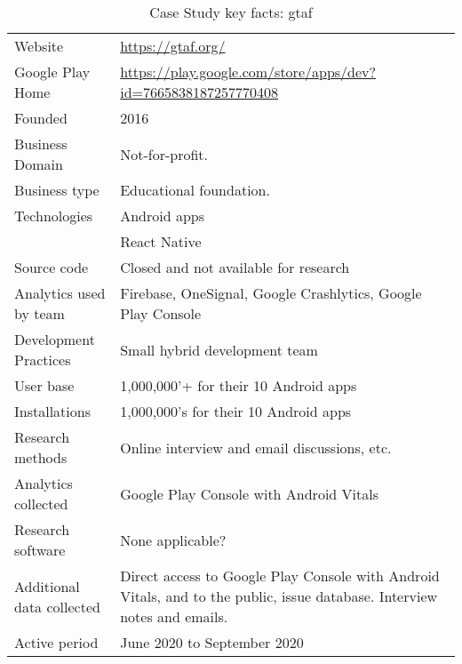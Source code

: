 {\renewcommand{\arraystretch}{0.8}%
\begin{table*}
    \centering
    \small
    \setlength{\tabcolsep}{6pt}
    \begin{tabular}{lp{11cm}}
       \toprule
       Website &\url{https://gtaf.org/} \\
       Google Play Home & \url{https://play.google.com/store/apps/dev?id=7665838187257770408} \\
       Founded & 2016 \\
       Business Domain & Not-for-profit.  \\
       Business type & Educational foundation. \\
       Technologies  & Android apps\footnotemark \\
       & React Native \\
       Source code  & Closed and not available for research \\
       Analytics used by team & Firebase, OneSignal, Google Crashlytics, Google Play Console \\
       Development Practices & Small hybrid development team \\
       \midrule
       User base & 1,000,000'+ for their 10 Android apps \\
       Installations & 1,000,000's for their 10 Android apps \\
       \midrule
       Research methods &Online interview and email discussions, etc. \\
       Analytics collected &Google Play Console with Android Vitals \\
       Research software & None applicable? \\
       Additional data collected &Direct access to Google Play Console with Android Vitals, and to the public, issue database. Interview notes and emails. \\
       Active period & June 2020 to September 2020 \\
       \bottomrule
    \end{tabular}
    \caption{Case Study key facts: \acrshort{gtaf}}
    \label{tab:gtaf_anaytics_overview}
\end{table*}
}




